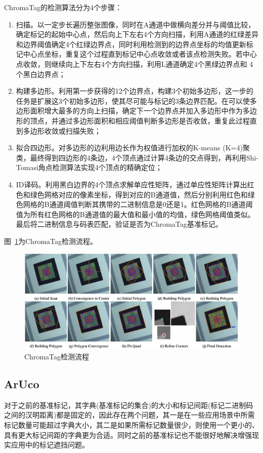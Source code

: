 ChromaTag的检测算法分为4个步骤：

\begin{enumerate}[label=(\arabic*)] 
	\item 扫描。以一定步长遍历整张图像，同时在A通道中做横向差分并与阈值比较，确定标记的起始中心点，然后向上下左右4个方向扫描，利用A通道的红绿差异和边界阈值确定4个红绿边界点，同时利用检测到的边界点坐标的均值更新标记中心点坐标，重复这个过程直到标记中心点收敛或者该点检测失败。若中心点收敛，则继续向上下左右4个方向扫描，利用L通道确定4个黑绿边界点和 4个黑白边界点；
	\item 构建多边形。利用第一步获得的12个边界点，构建3个初始多边形，这一步的任务是扩展这3个初始多边形，使其尽可能与标记的3条边界匹配。在可以使多边形面积增大最多的方向上扫描，确定下一个边界点并加入多边形中作为多边形的顶点，并通过多边形面积和相应阈值判断多边形是否收敛，重复此过程直到多边形收敛或扫描失败；
	\item 拟合四边形。对多边形的边利用边长作为权值进行加权的K-means (K=4)聚类，最终得到四边形的4条边，4个顶点通过计算4条边的交点得到，再利用Shi-Tomasi角点检测算法实现4个顶点的精确定位；
	\item ID译码。利用黑白边界的4个顶点求解单应性矩阵，通过单应性矩阵计算出红色和绿色网格对应的像素坐标，得到对应的B通道值，然后分别利用红色和绿色网格的B通道阈值判断其携带的二进制信息是0还是1。红色网格的B通道阈值为所有红色网格的B通道值的最大值和最小值的均值，绿色网格阈值类似。最后将二进制信息与码表匹配，验证是否为ChromaTag基准标记。
\end{enumerate}

图~\ref{fig:2-14}为ChromaTag检测流程。

\begin{figure}[htb]
	\centering
	\includegraphics[width=\linewidth]{figures/2-14.png}
	\caption{ChromaTag检测流程}
	\label{fig:2-14}
\end{figure}

\subsection{ArUco}
对于之前的基准标记，其字典(基准标记的集合)的大小和标记间距(标记二进制码之间的汉明距离)都是固定的，因此存在两个问题，其一是在一些应用场景中所需标记数量可能超过字典大小，其二是如果所需标记数量很少，则使用一个更小的、具有更大标记间距的字典更为合适。同时之前的基准标记也不能很好地解决增强现实应用中的标记遮挡问题。


